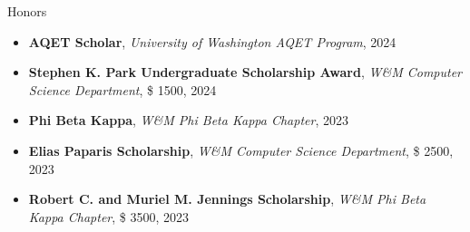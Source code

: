 \begin{rSection}{Honors}
\begin{itemize}
	\item \textbf {AQET Scholar}, \textit {University of Washington AQET Program}, 2024
	\item \textbf {Stephen K. Park Undergraduate Scholarship Award}, \textit {W\&M Computer Science Department}, \$ 1500, 2024
	\item \textbf {Phi Beta Kappa}, \textit {W\&M Phi Beta Kappa Chapter}, 2023
	\item \textbf {Elias Paparis Scholarship}, \textit {W\&M Computer Science Department}, \$ 2500, 2023
	\item \textbf {Robert C. and Muriel M. Jennings Scholarship}, \textit {W\&M Phi Beta Kappa Chapter}, \$ 3500, 2023
\end{itemize}
\end{rSection}